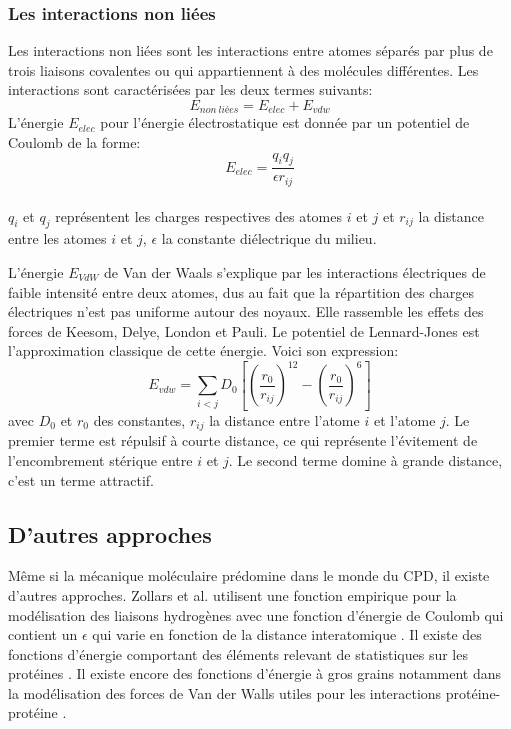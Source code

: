 \subsubsection{Les interactions non liées}
Les interactions non liées sont les interactions entre atomes séparés par plus de trois liaisons covalentes ou qui appartiennent à des molécules différentes. Les interactions sont caractérisées par les deux termes suivants:
\begin{equation}
E_{non\ liées} = E_{elec} + E_{vdw}  
\end{equation}
L'énergie $E_{elec}$ pour l'énergie électrostatique est donnée par un potentiel de Coulomb de la forme:
\begin{equation}
  E_{elec}=\frac{q_iq_j}{\epsilon r_{ij}}
\end{equation}\\
$q_i$ et $q_j$ représentent les charges respectives des atomes $i$ et $j$ et $r_{ij}$ la distance entre les atomes $i$ et $j$, $\epsilon$ la constante diélectrique du milieu.

L'énergie  $E_{VdW}$ de Van der Waals s'explique par les interactions électriques de faible intensité entre deux atomes, dus au fait que la répartition des charges électriques n'est pas uniforme autour des noyaux. Elle rassemble les effets des forces de Keesom, Delye, London et Pauli. Le potentiel de Lennard-Jones est l'approximation classique de cette énergie. Voici son expression:
\begin{equation}
    \label{VdW}
E_{vdw} = \sum_{i<j}D_0 [(\frac{r_0}{r_{ij}})^{12} - (\frac{r_0}{r_{ij}})^6]  
\end{equation}
avec $D_0$ et $r_0$ des constantes, $r_{ij}$ la distance entre l'atome $i$ et l'atome $j$. Le premier terme est répulsif à courte distance, ce qui représente l'évitement de l'encombrement stérique entre $i$ et $j$. Le second terme domine à grande distance, c'est un terme attractif. 
  

\subsection{D'autres approches}

Même si la mécanique moléculaire prédomine dans le monde du CPD, il existe d'autres approches. Zollars et al. utilisent une fonction empirique pour la modélisation des liaisons hydrogènes avec une fonction d'énergie de Coulomb qui contient un $\epsilon$ qui varie en fonction de la distance interatomique \cite{Zollars06}. Il existe des fonctions d'énergie comportant des éléments relevant de statistiques sur les protéines \cite{Pokala05}. Il existe encore des fonctions d'énergie à gros grains notamment dans la modélisation des forces de Van der Walls utiles pour les interactions protéine-protéine \cite{Korkut09}.

